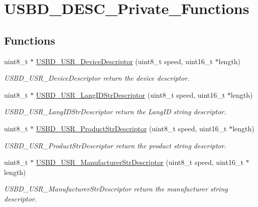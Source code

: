 \hypertarget{group__USBD__DESC__Private__Functions}{\section{U\-S\-B\-D\-\_\-\-D\-E\-S\-C\-\_\-\-Private\-\_\-\-Functions}
\label{group__USBD__DESC__Private__Functions}
}
\subsection*{Functions}
\begin{DoxyCompactItemize}
\item 
uint8\-\_\-t $\ast$ \hyperlink{group__USBD__DESC__Private__Functions_gadd5d311559f5cf53f393f9b863bd8aae}{U\-S\-B\-D\-\_\-\-U\-S\-R\-\_\-\-Device\-Descriptor} (uint8\-\_\-t speed, uint16\-\_\-t $\ast$length)
\begin{DoxyCompactList}\small\item\em U\-S\-B\-D\-\_\-\-U\-S\-R\-\_\-\-Device\-Descriptor return the device descriptor. \end{DoxyCompactList}\item 
uint8\-\_\-t $\ast$ \hyperlink{group__USBD__DESC__Private__Functions_gab5247caa36187728a45c43078d96497e}{U\-S\-B\-D\-\_\-\-U\-S\-R\-\_\-\-Lang\-I\-D\-Str\-Descriptor} (uint8\-\_\-t speed, uint16\-\_\-t $\ast$length)
\begin{DoxyCompactList}\small\item\em U\-S\-B\-D\-\_\-\-U\-S\-R\-\_\-\-Lang\-I\-D\-Str\-Descriptor return the Lang\-I\-D string descriptor. \end{DoxyCompactList}\item 
uint8\-\_\-t $\ast$ \hyperlink{group__USBD__DESC__Private__Functions_ga3e9f418a2337898da999ca7548c414a9}{U\-S\-B\-D\-\_\-\-U\-S\-R\-\_\-\-Product\-Str\-Descriptor} (uint8\-\_\-t speed, uint16\-\_\-t $\ast$length)
\begin{DoxyCompactList}\small\item\em U\-S\-B\-D\-\_\-\-U\-S\-R\-\_\-\-Product\-Str\-Descriptor return the product string descriptor. \end{DoxyCompactList}\item 
uint8\-\_\-t $\ast$ \hyperlink{group__USBD__DESC__Private__Functions_gaeb4b6e96436cb53ade2b8276568c27d1}{U\-S\-B\-D\-\_\-\-U\-S\-R\-\_\-\-Manufacturer\-Str\-Descriptor} (uint8\-\_\-t speed, uint16\-\_\-t $\ast$length)
\begin{DoxyCompactList}\small\item\em U\-S\-B\-D\-\_\-\-U\-S\-R\-\_\-\-Manufacturer\-Str\-Descriptor return the manufacturer string descriptor. \end{DoxyCompactList}\item 

\end{DoxyCompactItemize}

